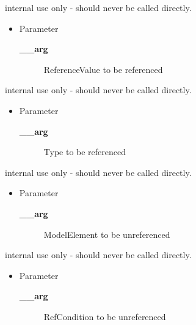 \begin{desc}internal use only - should never be called directly.
\begin{itemize}
\item{Parameter
  \begin{description}
   \item[{\bf \_\_arg}]{ReferenceValue to be referenced}
  \end{description}}
\end{itemize}
\end{desc}

\begin{desc}internal use only - should never be called directly.
\begin{itemize}
\item{Parameter
  \begin{description}
   \item[{\bf \_\_arg}]{Type to be referenced}
  \end{description}}
\end{itemize}
\end{desc}

\begin{desc}internal use only - should never be called directly.
\begin{itemize}
\item{Parameter
  \begin{description}
   \item[{\bf \_\_arg}]{ModelElement to be unreferenced}
  \end{description}}
\end{itemize}
\end{desc}

\begin{desc}internal use only - should never be called directly.
\begin{itemize}
\item{Parameter
  \begin{description}
   \item[{\bf \_\_arg}]{RefCondition to be unreferenced}
  \end{description}}
\end{itemize}
\end{desc}

